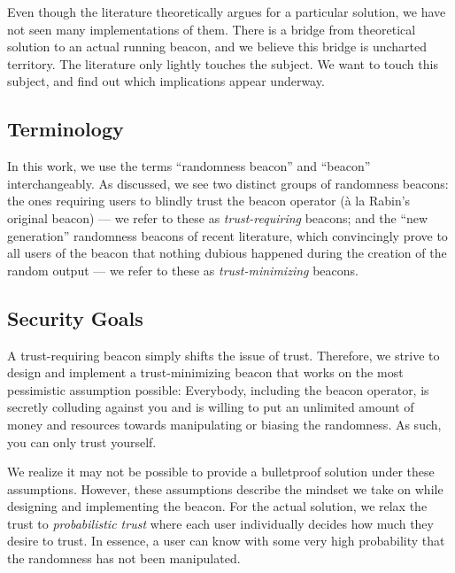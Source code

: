 Even though the literature theoretically argues for a particular solution, we have not seen many implementations of them. There is a bridge from theoretical solution to an actual running beacon, and we believe this bridge is uncharted territory. The literature only lightly touches the subject. We want to touch this subject, and find out which implications appear underway.

\subsection{Terminology}
In this work, we use the terms \enquote{randomness beacon} and \enquote{beacon} interchangeably. %
As discussed, we see two distinct groups of randomness beacons: the ones requiring users to blindly trust the beacon operator (à la Rabin's original beacon) --- we refer to these as \emph{trust-requiring} beacons; and the \enquote{new generation} randomness beacons of recent literature, which convincingly prove to all users of the beacon that nothing dubious happened during the creation of the random output --- we refer to these as \emph{trust-minimizing} beacons.


\subsection{Security Goals}\label{sec:security_goals}
A trust-requiring beacon simply shifts the issue of trust. Therefore, we strive to design and implement a trust-minimizing beacon that works on the most pessimistic assumption possible: Everybody, including the beacon operator, is secretly colluding against you and is willing to put an unlimited amount of money and resources towards manipulating or biasing the randomness. As such, you can only trust yourself.

We realize it may not be possible to provide a bulletproof solution under these assumptions. However, these assumptions describe the mindset we take on while designing and implementing the beacon. For the actual solution, we relax the trust to \emph{probabilistic trust} where each user individually decides how much they desire to trust.
In essence, a user can know with some very high probability that the randomness has not been manipulated.

